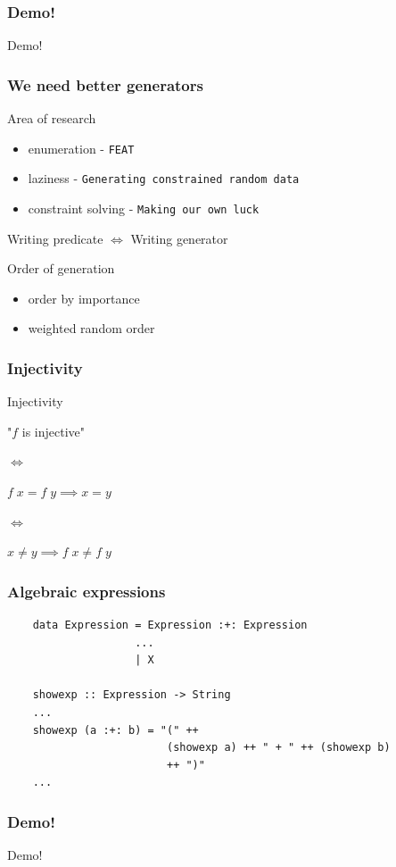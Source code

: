 \documentclass{beamer}
\begin{document}
\begin{frame}
    \frametitle{Demo!}
        \Huge{\centerline{Demo!}}
\end{frame}

\begin{frame}
    \frametitle{We need better generators}
        Area of research
        \begin{itemize}
            \item enumeration - \texttt{FEAT}
            \item laziness - \texttt{Generating constrained random data}
            \item constraint solving - \texttt{Making our own luck}
        \end{itemize}
        Writing predicate $\iff$ Writing generator\\
        \centerline{}
        Order of generation
        \begin{itemize}
            \item order by importance
            \item weighted random order
        \end{itemize}
\end{frame}

\begin{frame}
    \frametitle{Injectivity}
        \begin{block}{Injectivity}
            \centerline{"$f$ is injective"}
            \centerline{$\iff$}
            \centerline{$f\;x=f\;y\implies x = y$}
            \centerline{$\iff$}
            \centerline{$x \neq y \implies f\;x\neq f\;y$}
        \end{block}
\end{frame}

\begin{frame}[fragile]
    \frametitle{Algebraic expressions}
    \begin{verbatim}
    data Expression = Expression :+: Expression
                    ...
                    | X

    showexp :: Expression -> String
    ...
    showexp (a :+: b) = "(" ++
                         (showexp a) ++ " + " ++ (showexp b)
                         ++ ")"
    ...
    \end{verbatim}
\end{frame}

\begin{frame}
    \frametitle{Demo!}
        \Huge{\centerline{Demo!}}
\end{frame}
\end{document}
